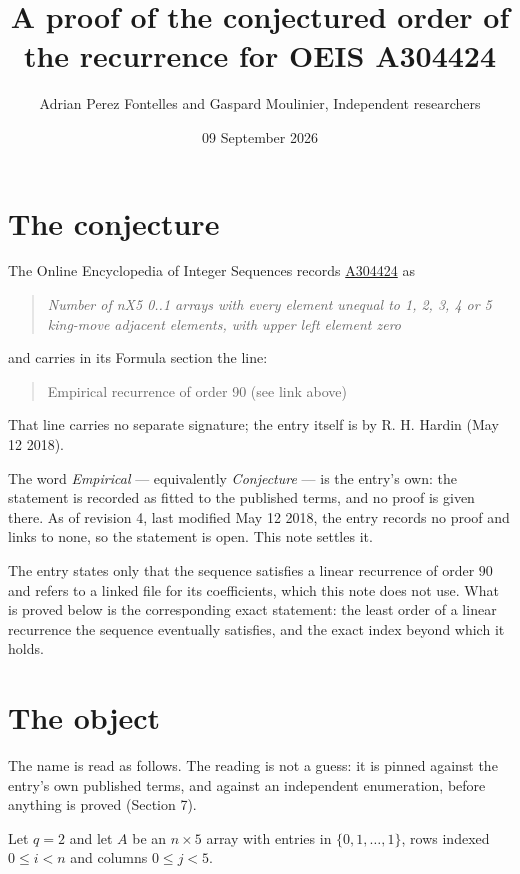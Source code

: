 \documentclass[11pt]{article}
\title{A proof of the conjectured order of the recurrence for OEIS A304424}
\author{Adrian Perez Fontelles and Gaspard Moulinier, Independent researchers}
\date{09 September 2026}
\theoremstyle{definition}
\begin{document}
\maketitle
\section{The conjecture}

The Online Encyclopedia of Integer Sequences records \href{https://oeis.org/A304424}{A304424} as

\begin{quote}\itshape Number of nX5 0..1 arrays with every element unequal to 1, 2, 3, 4 or 5 king-move adjacent elements, with upper left element zero\end{quote}

and carries in its Formula section the line:

\begin{quote}\ttfamily Empirical recurrence of order 90 (see link above)\end{quote}

That line carries no separate signature; the entry itself is by R. H. Hardin (May 12 2018).

The word {\itshape Empirical} --- equivalently {\itshape Conjecture} --- is the entry's own: the statement is recorded as fitted to the published terms, and no proof is given there. As of revision 4, last modified May 12 2018, the entry records no proof and links to none, so the statement is open. This note settles it.

The entry states only that the sequence satisfies a linear recurrence of order $90$ and refers to a linked file for its coefficients, which this note does not use. What is proved below is the corresponding exact statement: the least order of a linear recurrence the sequence eventually satisfies, and the exact index beyond which it holds.

\section{The object}

The name is read as follows. The reading is not a guess: it is pinned against the entry's own published terms, and against an independent enumeration, before anything is proved (Section 7).

Let $q = 2$ and let $A$ be an $n \times 5$ array with entries in $\{0,1,\dots,1\}$, rows indexed $0 \le i < n$ and columns $0 \le j < 5$.
\end{document}
